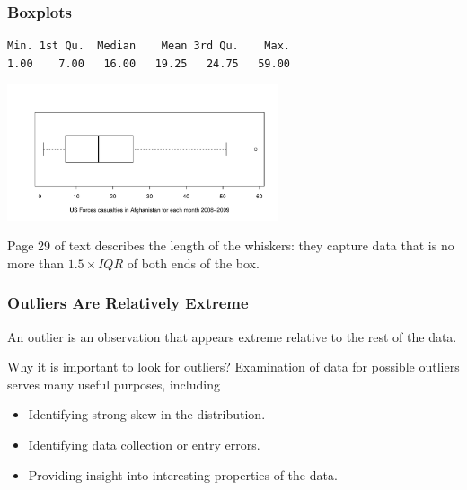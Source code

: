 \documentclass[handout]{beamer}
\newcommand{\blue}[1]{\textcolor{blue2}{#1}}
\begin{document}
\begin{frame}[fragile]
\frametitle{Boxplots}
\begin{verbatim}
Min. 1st Qu.  Median    Mean 3rd Qu.    Max. 
1.00    7.00   16.00   19.25   24.75   59.00 
\end{verbatim}
\begin{center}
\includegraphics[height=4cm]{figure/afghanistan.pdf}
\end{center}
\pause Page 29 of text describes the length of the \blue{whiskers}: they capture data that is no more than $1.5 \times IQR$ of both ends of the box.  

\end{frame}


\begin{frame}
\frametitle{Outliers Are Relatively Extreme}
An \blue{outlier} is an observation that appears extreme relative to the rest of the data.

\vspace{0.5cm}

\pause Why it is important to look for outliers?  Examination of data for possible outliers serves many useful purposes, including
\begin{itemize}
\pause\item Identifying strong skew in the distribution.
\pause\item Identifying data collection or entry errors.
\pause\item Providing insight into interesting properties of the data.
\end{itemize}

\end{frame}
\end{document}
